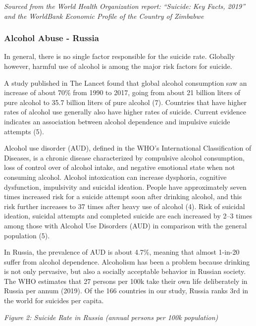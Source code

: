 \documentclass[]{article}
\begin{document}
\emph{Sourced from the World Health Organization report: ``Suicide: Key
Facts, 2019'' and the WorldBank Economic Profile of the Country of
Zimbabwe}

\subsubsection{Alcohol Abuse - Russia}\label{alcohol-abuse---russia}

In general, there is no single factor responsible for the suicide rate.
Globally however, harmful use of alcohol is among the major risk factors
for suicide.

A study published in The Lancet found that global alcohol consumption
saw an increase of about 70\% from 1990 to 2017, going from about 21
billion liters of pure alcohol to 35.7 billion liters of pure alcohol
(7). Countries that have higher rates of alcohol use generally also have
higher rates of suicide. Current evidence indicates an association
between alcohol dependence and impulsive suicide attempts (5).

Alcohol use disorder (AUD), defined in the WHO's International
Classification of Diseases, is a chronic disease characterized by
compulsive alcohol consumption, loss of control over of alcohol intake,
and negative emotional state when not consuming alcohol. Alcohol
intoxication can increase dysphoria, cognitive dysfunction, impulsivity
and suicidal ideation. People have approximately seven times increased
risk for a suicide attempt soon after drinking alcohol, and this risk
further increases to 37 times after heavy use of alcohol (4). Risk of
suicidal ideation, suicidal attempts and completed suicide are each
increased by 2--3 times among those with Alcohol Use Disorders (AUD) in
comparison with the general population (5).

In Russia, the prevalence of AUD is about 4.7\%, meaning that almost
1-in-20 suffer from alcohol dependence. Alcoholism has been a problem
because drinking is not only pervasive, but also a socially acceptable
behavior in Russian society. The WHO estimates that 27 persons per 100k
take their own life deliberately in Russia per annum (2019). Of the 166
countries in our study, Russia ranks 3rd in the world for suicides per
capita.

\emph{Figure 2: Suicide Rate in Russia (annual persons per 100k
population)}
\end{document}
